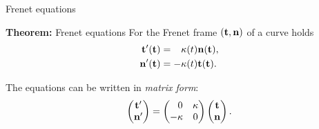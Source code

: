 \documentclass[pdf]{beamer}
\begin{document}
\begin{frame}{Frenet equations}

\begin{alertblock}{\textbf{Theorem:} Frenet equations}
    For the Frenet frame $(\bf t,\bf n)$ of a curve holds
    \begin{align*}
        \bf t'(t) &= \phantom+\kappa(t)\bf n(t),\\
        \bf n'(t) &= -\kappa(t)\bf t(t).
    \end{align*}%

    \vspace{-1em}
    {\hrulefill}

    The equations can be written in \emph{matrix form}:
    \[\begin{pmatrix}
    \bf t'\\\bf n'
    \end{pmatrix}=\begin{pmatrix}
    \phantom-0&\kappa\\-\kappa&0
    \end{pmatrix}\begin{pmatrix}
    \bf t\\\bf n
    \end{pmatrix}.\]
\end{alertblock}

\end{frame}
\end{document}
